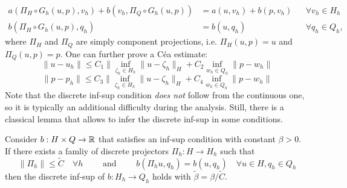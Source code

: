     \begin{equation}
        \begin{aligned}
            a(\Pi_H \circ G_h(u,p), v_h) + b(v_h, \Pi_Q \circ G_h(u,p)) &= a(u, v_h) + b(p, v_h) && \forall v_h \in H_h\\
            b(\Pi_H \circ G_h(u,p), q_h) &= b(u, q_h) && \forall q_h \in Q_h,
        \end{aligned}
    \end{equation}
    where $\Pi_H$ and $\Pi_Q$ are simply component projections, i.e. $\Pi_H(u,p) = u$ and $\Pi_Q(u,p) = p$. One can further prove a Céa estimate: 
    \begin{equation}
        \| u - u_h\| \leq C_1 \|\inf_{\zeta_h \in H_h}\| u -\zeta_h \|_H + C_2\inf_{w_h\in Q_h}\| p -w_h\|
    \end{equation}
    \begin{equation}
        \|p - p_h\| \leq C_3 \|\inf_{\zeta_h \in H_h}\| u -\zeta_h \|_H + C_4\inf_{w_h\in Q_h}\| p -w_h\|
    \end{equation}
Note that the discrete inf-sup condition \emph{does not} follow from the continuous one, so it is typically an additional difficulty during the analysis. Still, there is a classical lemma that allows to infer the discrete inf-sup in some conditions. 
\begin{lemma}\label{lemma:fortin}
    Consider $b:H\times Q\to \mathbb{R}$ that satisfies an inf-sup condition with constant $\beta >0$. If there exists a famliy of discrete projectors $\Pi_h: H\to H_h$ such that 
    \begin{equation}
        \|\Pi_h \|\leq \tilde C \quad \forall h \qquad \text{ and } \qquad b(\Pi_h u, q_h) = b(u, q_h) \quad\forall u\in H, q_h \in Q_h
    \end{equation}
    then the discrete inf-sup of $b:H_h\to Q_h$ holds with $\tilde \beta = \beta / \tilde C$.
\end{lemma}